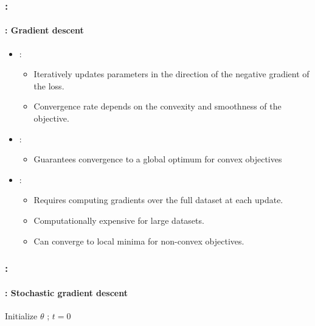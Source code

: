 \documentclass[xcolor=table]{beamer}
\begin{document}
\begin{frame}
	\frametitle{\insertshortsubtitle: \insertsection}
	\framesubtitle{\insertsubsection: Gradient descent}

	\begin{itemize}
		\item {}: 
		\begin{itemize}
			\item Iteratively updates parameters in the direction of the negative gradient of the loss.
			\item Convergence rate depends on the convexity and smoothness of the objective.
		\end{itemize}
		\item {}: 
		\begin{itemize}
			\item Guarantees convergence to a global optimum for convex objectives
		\end{itemize}
		\item {}: 
		\begin{itemize}
			\item Requires computing gradients over the full dataset at each update.
			\item Computationally expensive for large datasets.
			\item Can converge to local minima for non-convex objectives.
		\end{itemize}
	\end{itemize}

\end{frame}

\begin{frame}
	\frametitle{\insertshortsubtitle: \insertsection}
	\framesubtitle{\insertsubsection: Stochastic gradient descent}

	\begin{algorithm}[H]
		\KwResult{$ \theta $}
		Initialize $ \theta $ ; $ t = 0 $\;
		\caption{Stochastic gradient descent}
	\end{algorithm}

\end{frame}
\end{document}
